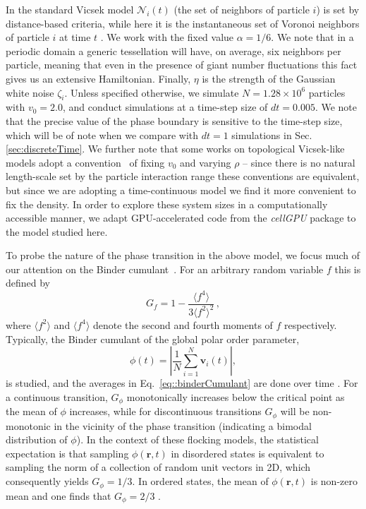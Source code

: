 \documentclass[twoside,twocolumn,9pt]{article}
\begin{document}
In the standard Vicsek model $\mathcal{N}_i(t)$ (the set of neighbors of particle $i$) is set by distance-based criteria, while here it is the instantaneous set of Voronoi neighbors of particle $i$ at time $t$ \cite{ginelli2010relevance,sussman2021non}.
We work with the fixed value $\alpha=1/6$. We note that in a periodic domain a generic tessellation will have, on average, six neighbors per particle, meaning that even in the presence of giant number fluctuations this fact gives us an extensive Hamiltonian. 
Finally, $\eta$ is the strength of the Gaussian white noise $\zeta_i$. Unless specified otherwise, we simulate $N=1.28\times10^6$ particles with $v_0=2.0$, and conduct simulations at a time-step size of $dt = 0.005$. We note that the precise value of the phase boundary is sensitive to the time-step size, which will be of note when we compare with $dt=1$ simulations in Sec. \ref{sec:discreteTime}.
We further note that some works on topological Vicsek-like models adopt a convention~\cite{martin2024fluctuation} of fixing $v_0$ and varying $\rho$ -- since there is no natural length-scale set by the particle interaction range these conventions are equivalent, but since we are adopting a time-continuous model we find it more convenient to fix the density.
In order to explore these system sizes in a computationally accessible manner, we adapt GPU-accelerated code from the \emph{cellGPU} package \cite{sussman2017cellgpu} to the model studied here.

To probe the nature of the phase transition in the above model, we focus much of our attention on the Binder cumulant~\cite{binder1981finite,binder1984finite,binder1987theory,binder1992monte}.
For an arbitrary random variable $f$ this is defined by
\begin{equation}
\label{eq::binderCumulant}
G_{f} = 1 - \frac{\langle{f^{4}}\rangle}{3\langle{f^2}\rangle^2}\,,
\end{equation}
where $\langle{f^2}\rangle$ and $\langle{f^4}\rangle$ denote the second and fourth moments of $f$ respectively.
Typically, the Binder cumulant of the global polar order parameter,
\begin{equation}
\label{eq::global_polar_order_parameter}
\phi(t)=\left|\frac{1}{N}\sum_{i=1}^N\mathbf{v}_{i}(t)\right|,
\end{equation}
is studied, and the averages in Eq.~\ref{eq::binderCumulant} are done over time \cite{chate2008collective,ginelli2010relevance}.
For a continuous transition, $G_{\phi}$ monotonically increases below the critical point as the mean of $\phi$ increases, while for discontinuous transitions $G_{\phi}$ will be non-monotonic in the vicinity of the phase transition (indicating a bimodal distribution of $\phi$).
In the context of these flocking models, the statistical expectation is that sampling $\phi(\mathbf{r},t)$ in disordered states is equivalent to sampling the norm of a collection of random unit vectors in 2D, which consequently yields $G_{\phi}=1/3$. In ordered states, the mean of $\phi(\mathbf{r},t)$ is non-zero mean and one finds that $G_{\phi}=2/3$ \cite{landau2021guide}.
\end{document}
